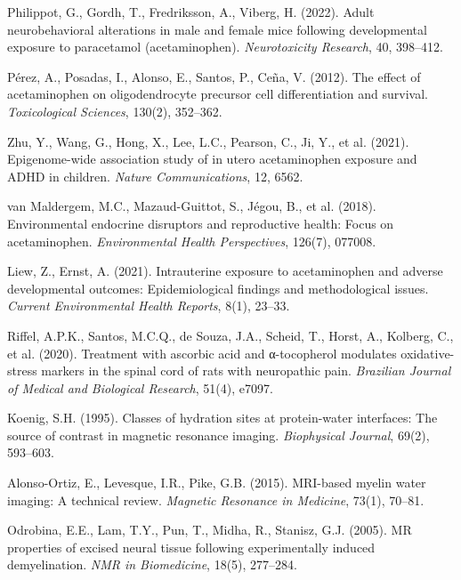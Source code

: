 \documentclass[11pt]{article}
\begin{document}
\begin{thebibliography}{99}
Philippot, G., Gordh, T., Fredriksson, A., Viberg, H. (2022).
Adult neurobehavioral alterations in male and female mice following developmental exposure to paracetamol (acetaminophen).
\textit{Neurotoxicity Research}, 40, 398--412.

Pérez, A., Posadas, I., Alonso, E., Santos, P., Ceña, V. (2012).
The effect of acetaminophen on oligodendrocyte precursor cell differentiation and survival.
\textit{Toxicological Sciences}, 130(2), 352--362.

Zhu, Y., Wang, G., Hong, X., Lee, L.C., Pearson, C., Ji, Y., et al. (2021).
Epigenome-wide association study of in utero acetaminophen exposure and ADHD in children.
\textit{Nature Communications}, 12, 6562.

van Maldergem, M.C., Mazaud-Guittot, S., Jégou, B., et al. (2018).
Environmental endocrine disruptors and reproductive health: Focus on acetaminophen.
\textit{Environmental Health Perspectives}, 126(7), 077008.

Liew, Z., Ernst, A. (2021).
Intrauterine exposure to acetaminophen and adverse developmental outcomes: Epidemiological findings and methodological issues.
\textit{Current Environmental Health Reports}, 8(1), 23--33.

Riffel, A.P.K., Santos, M.C.Q., de Souza, J.A., Scheid, T., Horst, A., Kolberg, C., et al. (2020).
Treatment with ascorbic acid and α-tocopherol modulates oxidative-stress markers in the spinal cord of rats with neuropathic pain.
\textit{Brazilian Journal of Medical and Biological Research}, 51(4), e7097.

Koenig, S.H. (1995).
Classes of hydration sites at protein-water interfaces: The source of contrast in magnetic resonance imaging.
\textit{Biophysical Journal}, 69(2), 593--603.

Alonso-Ortiz, E., Levesque, I.R., Pike, G.B. (2015).
MRI-based myelin water imaging: A technical review.
\textit{Magnetic Resonance in Medicine}, 73(1), 70--81.

Odrobina, E.E., Lam, T.Y., Pun, T., Midha, R., Stanisz, G.J. (2005).
MR properties of excised neural tissue following experimentally induced demyelination.
\textit{NMR in Biomedicine}, 18(5), 277--284.


\end{thebibliography}
\end{document}
